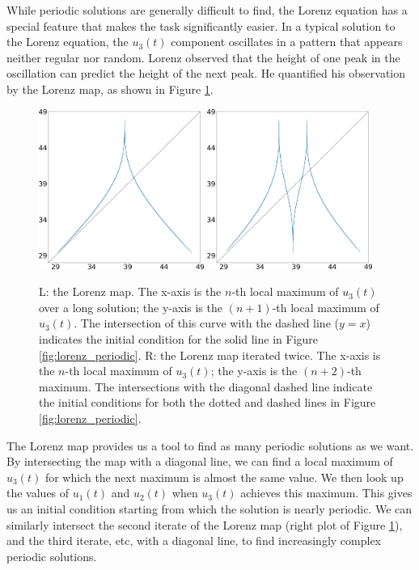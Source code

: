 While periodic solutions are generally difficult to find,
the Lorenz equation has a special feature that makes the task significantly
easier.  In a typical solution to the Lorenz equation, the 
$u_3(t)$ component oscillates in a pattern that appears neither regular nor random.  Lorenz
observed that the height of one peak in the oscillation can predict the height of the next peak.  He quantified his observation by the Lorenz map,
as shown in Figure \ref{fig:lorenz_map}.

\begin{figure}\centering
\includegraphics[width=0.48\textwidth]{lorenz_zmax_10_28_2.6666666666666665.png}
\hspace{0.02\textwidth}
\includegraphics[width=0.48\textwidth]{lorenz_zmax2_10_28_2.6666666666666665.png}
\caption{L: the Lorenz map.  The x-axis is the $n$-th local maximum of $u_3(t)$ over a
long solution; the y-axis is the $(n+1)$-th local maximum of $u_3(t)$.  The intersection of this curve
		with the dashed line ($y=x$) indicates the initial condition for the solid line
in Figure \ref{fig:lorenz_periodic}.
R: the Lorenz map iterated twice.  The x-axis is the $n$-th local maximum
of $u_3(t)$; the y-axis is the $(n+2)$-th maximum.  The intersections with the diagonal dashed
line indicate the initial conditions for both the dotted and dashed lines in
Figure \ref{fig:lorenz_periodic}.}
\label{fig:lorenz_map}
\end{figure}
The Lorenz map provides us a tool to find as many periodic solutions as we want.
By intersecting the map with a diagonal line, we can find a local maximum of $u_3(t)$
for which the next maximum is almost the same value.  We then look up the values of
$u_1(t)$ and $u_2(t)$ when $u_3(t)$ achieves this maximum.  This gives us an initial
condition starting from which the solution is nearly periodic.   We can similarly
intersect the second iterate of the Lorenz map (right plot of Figure \ref{fig:lorenz_map}),
and the third iterate, etc, with a diagonal line, to find increasingly
complex periodic solutions. 


